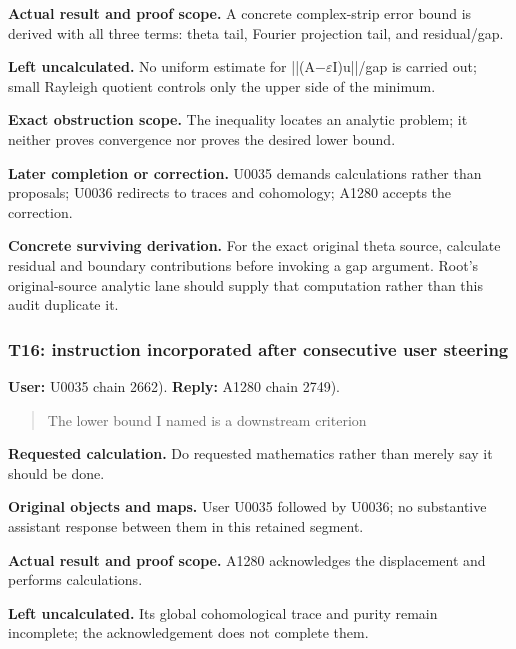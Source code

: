 \textbf{Actual result and proof scope.} A concrete complex-strip error
bound is derived with all three terms: theta tail, Fourier projection
tail, and residual/gap.

\textbf{Left uncalculated.} No uniform estimate for
||(A\allowbreak{}\ensuremath{−}\allowbreak{}\allowbreak{}\ensuremath{ε}\allowbreak{}I)u||/gap
is carried out; small Rayleigh quotient controls only the upper side of
the minimum.

\textbf{Exact obstruction scope.} The inequality locates an analytic
problem; it neither proves convergence nor proves the desired lower
bound.

\textbf{Later completion or correction.} U0035 demands calculations
rather than proposals; U0036 redirects to traces and cohomology; A1280
accepts the correction.

\textbf{Concrete surviving derivation.} For the exact original theta
source, calculate residual and boundary contributions before invoking a
gap argument. Root's original-source analytic lane should supply that
computation rather than this audit duplicate it.

\subsubsection{T16: instruction incorporated after consecutive user
steering}\label{TranscriptLedgerStage:t16-instruction-incorporated-after-consecutive-user-steering}

\textbf{User:} U0035
\protect{} chain 2662).
\textbf{Reply:} A1280
\protect{} chain 2749).

\begin{quote}
The lower bound I named is a downstream criterion
\end{quote}

\textbf{Requested calculation.} Do requested mathematics rather than
merely say it should be done.

\textbf{Original objects and maps.} User U0035 followed by U0036; no
substantive assistant response between them in this retained segment.

\textbf{Actual result and proof scope.} A1280 acknowledges the
displacement and performs
\protect{}
calculations.

\textbf{Left uncalculated.} Its global cohomological trace and purity
remain incomplete; the acknowledgement does not complete them.

